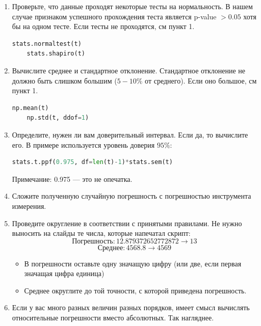 \documentclass{article}
\begin{document}
\begin {enumerate}
\item Проверьте, что данные проходят некоторые тесты на нормальность. В нашем случае признаком успешного прохождения теста является p-value $> 0.05$ хотя бы на одном тесте. Если тесты не проходятся, см пункт 1.
\begin{lstlisting}[language=Python]
	stats.normaltest(t)
	stats.shapiro(t)
\end{lstlisting}

\item Вычислите среднее и стандартное отклонение. Стандартное отклонение не должно быть слишком большим ($5-10\%$ от среднего). Если оно большое, см пункт 1.
\begin{lstlisting}[language=Python]
	np.mean(t)
	np.std(t, ddof=1)
\end{lstlisting}

\item Определите, нужен ли вам доверительный интервал. Если да, то вычислите его. В примере используется уровень доверия $95\%$:
\begin{lstlisting}[language=Python]
	stats.t.ppf(0.975, df=len(t)-1)*stats.sem(t)
\end{lstlisting}
Примечание: 0.975 --- это не опечатка.

\item Сложите полученную случайную погрешность с погрешностью инструмента измерения.

\item Проведите округление в соответствии с принятыми правилами. Не нужно выносить на слайды те числа, которые напечатал скрипт:
$$ \text{Погрешность}: 12.879372652772872 \rightarrow 13 $$
$$ \text{Среднее}: 4568.8 \rightarrow 4569 $$
\begin{itemize}
\item В погрешности оставьте одну значащую цифру (или две, если первая значащая цифра единица)
\item Среднее округлите до той точности, с которой приведена погрешность.
\end{itemize}

\item Если у вас много разных величин разных порядков, имеет смысл вычислять относительные погрешности вместо абсолютных. Так нагляднее.
\end{enumerate}
\end{document}
